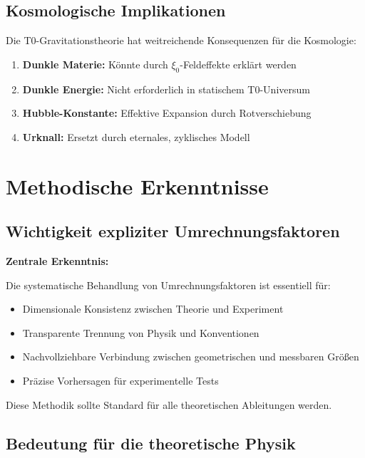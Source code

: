 \documentclass[12pt,a4paper]{article}
\begin{document}
	\subsection{Kosmologische Implikationen}
	
	Die T0-Gravitationstheorie hat weitreichende Konsequenzen für die Kosmologie:
	
	\begin{enumerate}
		\item \textbf{Dunkle Materie:} Könnte durch $\xi_0$-Feldeffekte erklärt werden
		\item \textbf{Dunkle Energie:} Nicht erforderlich in statischem T0-Universum
		\item \textbf{Hubble-Konstante:} Effektive Expansion durch Rotverschiebung
		\item \textbf{Urknall:} Ersetzt durch eternales, zyklisches Modell
	\end{enumerate}
	
	\section{Methodische Erkenntnisse}
	
	\subsection{Wichtigkeit expliziter Umrechnungsfaktoren}
	
	\begin{keyresult}
		\textbf{Zentrale Erkenntnis:}
		
		Die systematische Behandlung von Umrechnungsfaktoren ist essentiell für:
		\begin{itemize}
			\item Dimensionale Konsistenz zwischen Theorie und Experiment
			\item Transparente Trennung von Physik und Konventionen
			\item Nachvollziehbare Verbindung zwischen geometrischen und messbaren Größen
			\item Präzise Vorhersagen für experimentelle Tests
		\end{itemize}
		
		Diese Methodik sollte Standard für alle theoretischen Ableitungen werden.
	\end{keyresult}
	
	\subsection{Bedeutung für die theoretische Physik}
	
\end{document}
